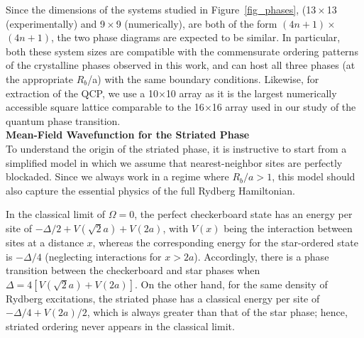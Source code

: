\documentclass[reprint,twocolumn,secnumarabic,amssymb, aps, prl]{revtex4-1}
\begin{document}
Since the dimensions of the systems studied in Figure~\ref{fig_phases}, (13\,$\times$\,13 (experimentally) and 9\,$\times$\,9 (numerically), are both of the form $(4n+1)$\,$\times$\,$(4n+1)$, the two phase diagrams are expected to be similar. In particular, both these system sizes are compatible with the commensurate ordering patterns of the crystalline phases observed in this work, and can host all three phases (at the appropriate $R_b$/a) with the same boundary conditions. Likewise, for extraction of the QCP, we use a 10$\times$10 array as it is the largest numerically accessible square lattice comparable to the 16$\times$16 array used in our study of the quantum phase transition.\\

\noindent\textbf{Mean-Field Wavefunction for the Striated Phase}\\
To understand the origin of the striated phase, it is instructive to start from a simplified model in which we assume that nearest-neighbor sites are perfectly blockaded. Since we always work in a regime where $R_b/a > 1$, this model should also capture the essential physics of the full Rydberg Hamiltonian.

In the classical limit of $\Omega = 0$, the perfect checkerboard state has an energy per site of $-\Delta/2 + V (\sqrt{2}a) + V (2a)$, with $V(x)$ being the interaction between sites at a distance $x$, whereas the corresponding energy for the star-ordered state is $-\Delta/4$ (neglecting interactions for $x>2a$). Accordingly, there is a phase transition between the checkerboard and star phases when $\Delta = 4 [V (\sqrt{2}a) + V (2a)]$. On the other hand, for the same density of Rydberg excitations, the striated phase has a classical energy per site of $-\Delta/4 + V (2a)/2$, which is always greater than that of the star phase; hence, striated ordering never appears in the classical limit.
\end{document}
